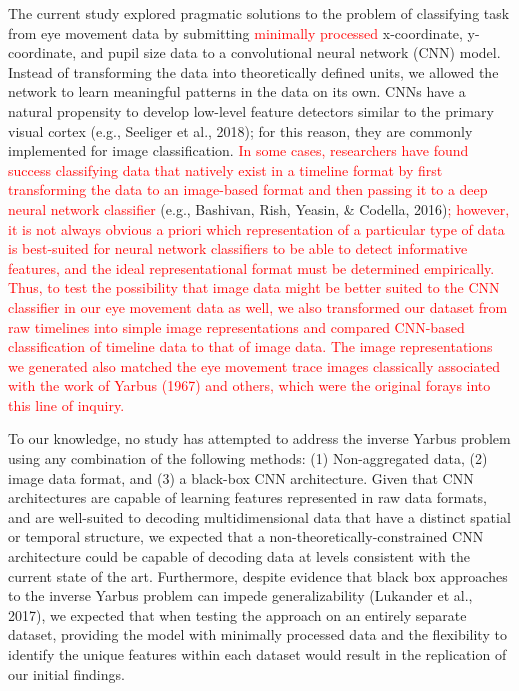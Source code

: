 \documentclass[
  english,
  man, donotrepeattitle,floatsintext]{apa6}
\begin{document}
The current study explored pragmatic solutions to the problem of classifying task from eye movement data by submitting \textcolor{red}{minimally processed} x-coordinate, y-coordinate, and pupil size data to a convolutional neural network (CNN) model. Instead of transforming the data into theoretically defined units, we allowed the network to learn meaningful patterns in the data on its own. CNNs have a natural propensity to develop low-level feature detectors similar to the primary visual cortex (e.g., Seeliger et al., 2018); for this reason, they are commonly implemented for image classification. \textcolor{red}{In some cases, researchers have found success classifying data that natively exist in a timeline format by first transforming the data to an image-based format and then passing it to a deep neural network classifier }(e.g., Bashivan, Rish, Yeasin, \& Codella, 2016)\textcolor{red}{; however, it is not always obvious a priori which representation of a particular type of data is best-suited for neural network classifiers to be able to detect informative features, and the ideal representational format must be determined empirically. Thus, to test the possibility that image data might be better suited to the CNN classifier in our eye movement data as well, we also transformed our dataset from raw timelines into simple image representations and compared CNN-based classification of timeline data to that of image data. The image representations we generated also matched the eye movement trace images classically associated with the work of Yarbus (1967) and others, which were the original forays into this line of inquiry.}

To our knowledge, no study has attempted to address the inverse Yarbus problem using any combination of the following methods: (1) Non-aggregated data, (2) image data format, and (3) a black-box CNN architecture. Given that CNN architectures are capable of learning features represented in raw data formats, and are well-suited to decoding multidimensional data that have a distinct spatial or temporal structure, we expected that a non-theoretically-constrained CNN architecture could be capable of decoding data at levels consistent with the current state of the art. Furthermore, despite evidence that black box approaches to the inverse Yarbus problem can impede generalizability (Lukander et al., 2017), we expected that when testing the approach on an entirely separate dataset, providing the model with minimally processed data and the flexibility to identify the unique features within each dataset would result in the replication of our initial findings.
\end{document}
